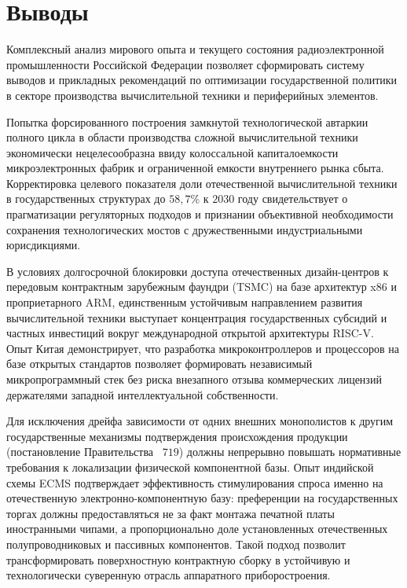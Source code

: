 \documentclass[12pt,a4paper]{article}
\begin{document}
\section{Выводы}

Комплексный анализ мирового опыта и текущего состояния 
радиоэлектронной промышленности Российской Федерации позволяет 
сформировать систему выводов и прикладных рекомендаций по оптимизации 
государственной политики в секторе производства вычислительной техники 
и периферийных элементов.

Попытка форсированного построения замкнутой технологической автаркии 
полного цикла в области производства сложной вычислительной техники 
экономически нецелесообразна ввиду колоссальной капиталоемкости 
микроэлектронных фабрик и ограниченной емкости внутреннего рынка 
сбыта. Корректировка целевого показателя доли отечественной 
вычислительной техники в государственных структурах до $58{,}7\%$ к 
$2030$ году свидетельствует о прагматизации регуляторных подходов и 
признании объективной необходимости сохранения технологических мостов 
с дружественными индустриальными юрисдикциями.

В условиях долгосрочной блокировки доступа отечественных 
дизайн-центров к передовым контрактным зарубежным фаундри (TSMC) 
на базе архитектур x$86$ и проприетарного ARM, единственным 
устойчивым направлением развития вычислительной техники выступает 
концентрация государственных субсидий и частных инвестиций вокруг 
международной открытой архитектуры RISC-V. Опыт Китая демонстрирует, 
что разработка микроконтроллеров и процессоров на базе открытых 
стандартов позволяет формировать независимый микропрограммный стек 
без риска внезапного отзыва коммерческих лицензий держателями 
западной интеллектуальной собственности.

Для исключения дрейфа зависимости от одних внешних монополистов к 
другим государственные механизмы подтверждения происхождения продукции 
(постановление Правительства \textnumero~$719$) должны непрерывно 
повышать нормативные требования к локализации физической компонентной 
базы. Опыт индийской схемы ECMS подтверждает эффективность 
стимулирования спроса именно на отечественную электронно-компонентную 
базу: преференции на государственных торгах должны предоставляться 
не за факт монтажа печатной платы иностранными чипами, а 
пропорционально доле установленных отечественных полупроводниковых и 
пассивных компонентов. Такой подход позволит трансформировать 
поверхностную контрактную сборку в устойчивую и технологически 
суверенную отрасль аппаратного приборостроения.
\end{document}
